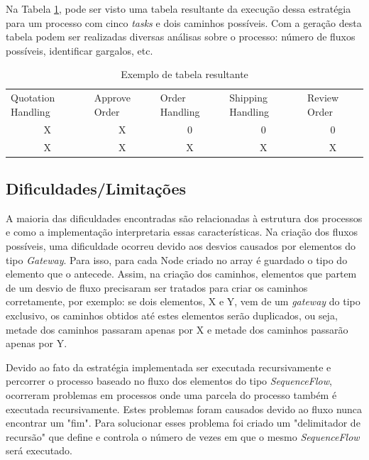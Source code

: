 \documentclass[12pt]{article}
\begin{document}
Na Tabela \ref{tab:exemplo}, pode ser visto uma tabela resultante da execução dessa estratégia para um processo com cinco \emph{tasks} e dois caminhos possíveis. Com a geração desta tabela podem ser realizadas diversas análisas sobre o processo: número de fluxos possíveis, identificar gargalos, etc.

\begin{table}[]
\centering
\caption{Exemplo de tabela resultante}
\label{tab:exemplo}
\begin{tabular}{ccccc}
\multicolumn{1}{l}{Quotation Handling} & \multicolumn{1}{l}{Approve Order} & \multicolumn{1}{l}{Order Handling} & \multicolumn{1}{l}{Shipping Handling} & \multicolumn{1}{l}{Review Order} \\
X & X & 0 & 0 & 0 \\
X & X & X & X & X
\end{tabular}
\end{table}

\subsection{Dificuldades/Limitações}
A maioria das dificuldades encontradas são relacionadas à estrutura dos processos e como a implementação interpretaria essas características. Na criação dos fluxos possíveis, uma dificuldade ocorreu devido aos desvios causados por elementos do tipo \emph{Gateway}. Para isso, para cada Node criado no array é guardado o tipo do elemento que o antecede. Assim, na criação dos caminhos, elementos que partem de um desvio de fluxo precisaram ser tratados para criar os caminhos corretamente, por exemplo: se dois elementos, X e Y, vem de um \emph{gateway} do tipo  exclusivo, os caminhos obtidos até estes elementos serão duplicados, ou seja, metade dos caminhos passaram apenas por X e metade dos caminhos passarão apenas por Y.


Devido ao fato da estratégia implementada ser executada recursivamente e percorrer o processo baseado no fluxo dos elementos do tipo \emph{SequenceFlow}, ocorreram problemas em processos onde uma parcela do processo também é executada recursivamente. Estes problemas foram causados devido ao fluxo nunca encontrar um "fim". Para solucionar esses problema foi criado um "delimitador de recursão" que define e controla o número de vezes em que o mesmo \emph{SequenceFlow} será executado.
\end{document}
